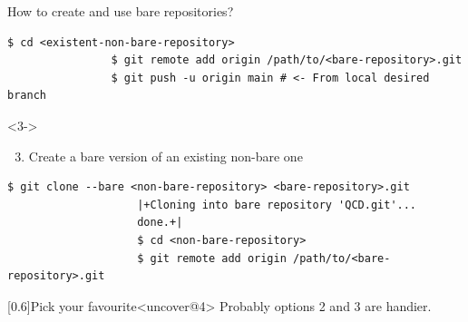 \documentclass[usenames,svgnames,14pt]{beamer}
\begin{document}
\begin{frame}[fragile]{How to create and use bare repositories?}
\begin{overlayarea}{\textwidth}{0.8\textheight}
\begin{onlyenv}
\begin{lstlisting}[style=MyBash]
                $ cd <existent-non-bare-repository>
                $ git remote add origin /path/to/<bare-repository>.git
                $ git push -u origin main # <- From local desired branch
            \end{lstlisting}
            \vspace{1mm}
            \begin{uncoverenv}<3->
                \begin{enumerate}
                    \setcounter{enumi}{2}
                    \item Create a bare version of an existing non-bare one
                \end{enumerate}
                \begin{lstlisting}[style=MyBash]
                    $ git clone --bare <non-bare-repository> <bare-repository>.git
                    |+Cloning into bare repository 'QCD.git'...
                    done.+|
                    $ cd <non-bare-repository>
                    $ git remote add origin /path/to/<bare-repository>.git
                \end{lstlisting}
            \end{uncoverenv}
            \vspace{-1mm}
            \begin{varblock}{}[0.6\textwidth]{Pick your favourite}<uncover@4>
                \small Probably options 2 and 3 are handier.
            \end{varblock}
        \end{onlyenv}
    \end{overlayarea}
\end{frame}


\end{document}

